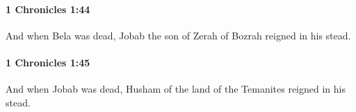 		\paragraph{1 Chronicles 1:44} %
			\label{1CHRONICLES-1-44}

			And when Bela was dead, Jobab the son of Zerah of Bozrah reigned in his stead.


		\paragraph{1 Chronicles 1:45} %
			\label{1CHRONICLES-1-45}

			And when Jobab was dead, Husham of the land of the Temanites reigned in his stead.


